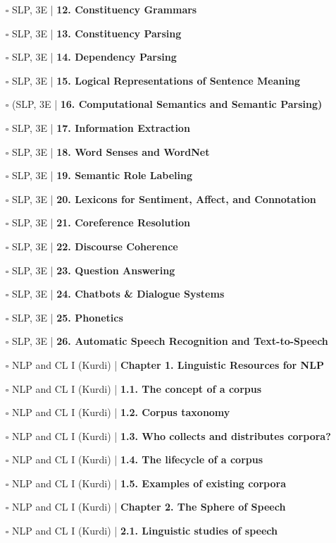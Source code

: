 \documentclass[a4, landscape, 12pt]{article}
\newcommand{\checkbox}{$\square$}%
\begin{document}
\begin{itemize}
{}
\item [\checkbox]  SLP, 3E | \textbf{ 12. Constituency Grammars
}
\item [\checkbox]  SLP, 3E | \textbf{ 13. Constituency Parsing
}
\item [\checkbox]  SLP, 3E | \textbf{ 14. Dependency Parsing
}
\item [\checkbox]  SLP, 3E | \textbf{ 15. Logical Representations of Sentence Meaning
}
\item [\checkbox]  (SLP, 3E | \textbf{ 16. Computational Semantics and Semantic Parsing)
}
\item [\checkbox]  SLP, 3E | \textbf{ 17. Information Extraction
}
\item [\checkbox]  SLP, 3E | \textbf{ 18. Word Senses and WordNet
}
\item [\checkbox]  SLP, 3E | \textbf{ 19. Semantic Role Labeling
}
\item [\checkbox]  SLP, 3E | \textbf{ 20. Lexicons for Sentiment, Affect, and Connotation
}
\item [\checkbox]  SLP, 3E | \textbf{ 21. Coreference Resolution
}
\item [\checkbox]  SLP, 3E | \textbf{ 22. Discourse Coherence
}
\item [\checkbox]  SLP, 3E | \textbf{ 23. Question Answering
}
\item [\checkbox]  SLP, 3E | \textbf{ 24. Chatbots & Dialogue Systems
}
\item [\checkbox]  SLP, 3E | \textbf{ 25. Phonetics
}
\item [\checkbox]  SLP, 3E | \textbf{ 26. Automatic Speech Recognition and Text-to-Speech
}
\item [\checkbox]  NLP and CL I (Kurdi) | \textbf{ Chapter 1. Linguistic Resources for NLP
}
\item [\checkbox]  NLP and CL I (Kurdi) | \textbf{ 1.1. The concept of a corpus
}
\item [\checkbox]  NLP and CL I (Kurdi) | \textbf{ 1.2. Corpus taxonomy
}
\item [\checkbox]  NLP and CL I (Kurdi) | \textbf{ 1.3. Who collects and distributes corpora?
}
\item [\checkbox]  NLP and CL I (Kurdi) | \textbf{ 1.4. The lifecycle of a corpus
}
\item [\checkbox]  NLP and CL I (Kurdi) | \textbf{ 1.5. Examples of existing corpora
}
\item [\checkbox]  NLP and CL I (Kurdi) | \textbf{ Chapter 2. The Sphere of Speech
}
\item [\checkbox]  NLP and CL I (Kurdi) | \textbf{ 2.1. Linguistic studies of speech
}
\end{itemize}
\end{document}
